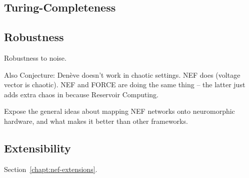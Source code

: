 \subsection{Turing-Completeness}


\subsection{Robustness}

Robustness to noise.

Also Conjecture: Den\`eve doesn't work in chaotic settings. NEF does (voltage vector is chaotic). NEF and FORCE are doing the same thing -- the latter just adds extra chaos in because Reservoir Computing.



Expose the general ideas about mapping NEF networks onto neuromorphic hardware, and what makes it better than other frameworks.


\subsection{Extensibility}

Section~\ref{chapt:nef-extensions}.
